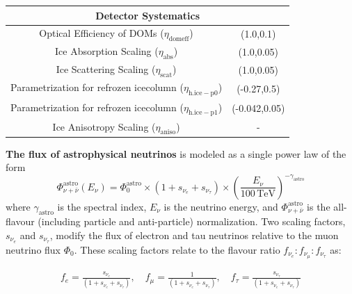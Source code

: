 \begin{table}[h]
\begin{tabular}{ |c |c|}
        \multicolumn{2}{c}{\textbf{Detector Systematics}}\\
        \hline
        Optical Efficiency of DOMs ($\eta_{\mathrm{domeff}}$) & (1.0,0.1)\\
        Ice Absorption Scaling ($\eta_{\mathrm{abs}}$)  & (1.0,0.05)\\
        Ice Scattering Scaling ($\eta_{\mathrm{scat}}$) & (1.0,0.05)\\
        Parametrization for refrozen icecolumn ($\eta_{\mathrm{h.ice-p0}}$)  & (-0.27,0.5)\\
        Parametrization for refrozen icecolumn ($\eta_{\mathrm{h.ice-p1}}$) & (-0.042,0.05)\\
        Ice Anisotropy Scaling ($\eta_{\mathrm{aniso}}$) &  -\\
        \hline
        \hline
    \end{tabular}
    
\end{table}

\textbf{The flux of astrophysical neutrinos} is modeled as a single power law of the form
\begin{equation}\label{eq:SPL}
\Phi_{\nu + \bar{\nu}}^{\mathrm{astro}}(E_{\nu}) = \Phi_{\mathrm{0}}^{\mathrm{astro}} \times 
    (1 + s_{\nu_{e}} + s_{\nu_{\tau}}) \times
    \left( \frac{E_\nu}{\mathrm{100\,TeV}} \right)^{-\gamma_{\mathrm{astro}}}
\end{equation}
where $\gamma_{\mathrm{astro}}$ is the spectral index, $E_\nu$ is the neutrino energy, and $\Phi_{\nu + \bar{\nu}}^{\mathrm{astro}}$ is the all-flavour (including particle and anti-particle) normalization. Two scaling factors, $s_{\nu_{e}}$ and $s_{\nu_{\tau}}$, modify the flux of electron and tau neutrinos relative to the muon neutrino flux $\Phi_{\mathrm{0}}$. These scaling factors relate to the flavour ratio $f_{\nu_e}:f_{\nu_{\mu}}:f_{\nu_{\tau}}$ as:

\begin{equation}\label{eq:flav_frac}
    \begin{array}{rcl}
        f_{e} = \frac{s_{\nu_{e}}}{(1 + s_{\nu_{e}} + s_{\nu_{\tau}})}, \quad
        f_{\mu} = \frac{1}{(1 + s_{\nu_{e}} + s_{\nu_{\tau}})}, \quad
        f_{\tau} = \frac{s_{\nu_{\tau}}}{(1 + s_{\nu_{e}} + s_{\nu_{\tau}})}
    \end{array}
\end{equation}

